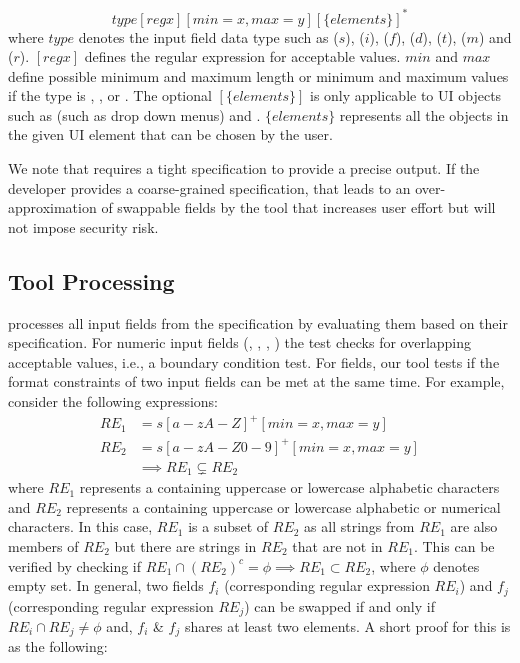 $$type[regx][min = x, max = y][\{elements\}]^*$$
%
where $type$ denotes the input field data type such as \String($s$), \integer($i$), \float($f$), \Date($d$), \Time($t$), \menu($m$) and \radio ($r$). $[regx]$ defines the regular expression for acceptable values. $min$ and $max$ define possible minimum and maximum \String length or minimum and maximum values if the type is \integer, \float, \Date or \Time. The optional $[\{elements\}]$ is only applicable to UI objects such as \Menu (such as drop down menus) and \radio. $\{elements\}$ represents all the objects in the given UI element that can be chosen by the user.  


We note that \tool requires a tight specification to provide a precise output. If the developer provides a coarse-grained specification, that leads to an over-approximation of swappable fields by the tool that increases user effort but will not impose security risk.

\subsection{Tool Processing} 

\tool processes all input fields from the specification by evaluating them based on their specification. For numeric input fields (\integer, \float, \Time, \Date) the test checks for overlapping acceptable values, i.e., a boundary condition test. %
%
For \String fields, our tool tests if the format constraints of two input fields can be met at the same time. For example, consider the following expressions:\vspace{2pt}
\begin{align*}
RE_1 &= s[a-zA-Z]^+[min=x, max=y]\\
RE_2 &= s[a-zA-Z0-9]^+[min=x, max=y]\\
&\implies RE_1 \subsetneq  RE_2
\end{align*}
where $RE_1$ represents a \String containing uppercase or lowercase alphabetic characters and $RE_2$ represents a \String containing uppercase or lowercase alphabetic or numerical characters. In this case, $RE_1$ is a subset of $RE_2$ as all strings from $RE_1$ are also members of $RE_2$ but there are strings in $RE_2$ that are not in $RE_1$. This can be verified by checking if $RE_1\cap (RE_2)^c = \phi \implies RE_1 \subset RE_2$, where $\phi$ denotes empty set.
%
In general, two fields $f_i$ (corresponding regular expression $RE_i$) and $f_j$ (corresponding regular expression $RE_j$) can be swapped  if and only if $RE_i \cap RE_j \neq \phi$ and, $f_i$ \& $f_j$ shares at least two elements. A short proof for this is as the following:

